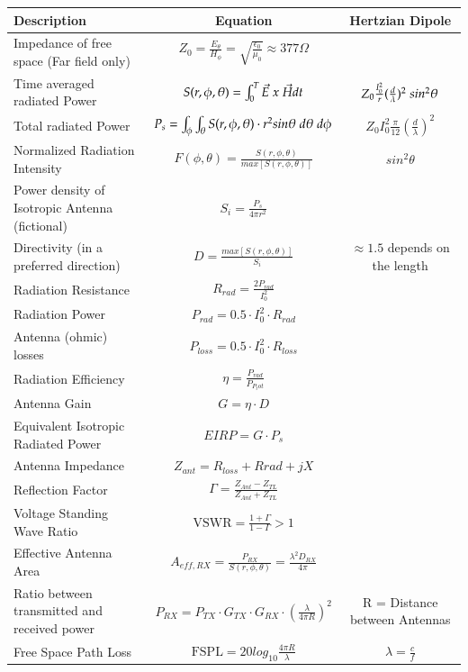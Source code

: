 \begin{tabular}{|l|c|c|}
	\hline \textbf{Description} & \textbf{Equation} & \textbf{Hertzian Dipole}\\
	\hline Impedance of free space (Far field only) & $Z_0 =\frac{E_\theta}{H_\phi} = \sqrt{\frac{\epsilon_0}{\mu_0}} \approx 377 \Omega$ & \\
	\hline Time averaged radiated Power & $S(r,\phi,\theta)=\int_{0}^{T}\vec{E}\hspace{0.1cm} x\hspace{0.1cm} \vec{H}dt $ & $Z_0 \frac{I_0^2}{r}(\frac{d}{\lambda})^2 \hspace{0.1cm} sin^2 \theta$ \\
	\hline Total radiated Power & $ P_s=\int_{\phi}^{}\int_{\theta}^{}S(r,\phi,\theta)\cdot r^2 sin\theta \hspace{0.1cm} d\theta\hspace{0.1cm} d\phi$ & $Z_0 I_0^2 \frac{\pi}{12}(\frac{d}{\lambda})^2$   \\
	\hline Normalized Radiation Intensity & $ F(\phi,\theta)=\frac{S(r,\phi,\theta)}{max[S(r,\phi,\theta)]}$ & $sin^2 \theta$\\
	\hline Power density of Isotropic Antenna (fictional) & $ S_i = \frac{P_s}{4\pi r^2}$ & \\
	\hline Directivity (in a preferred direction) & $ D = \frac{max[S(r,\phi,\theta)]}{S_i}$ & $\approx 1.5 $ depends on the length\\
	\hline Radiation Resistance & $ R_{rad} = \frac{2P_{rad}}{I_0^2}$ & \\
	\hline Radiation Power & $ P_{rad} = 0.5 \cdot I_0^2 \cdot R_{rad} $ & \\ 
	\hline Antenna (ohmic) losses & $ P_{loss} = 0.5 \cdot I_0^2 \cdot R_{loss} $ & \\ 
	\hline Radiation Efficiency & $ \eta = \frac{P_{rad}}{P_{P_tot}}$ & \\
	\hline Antenna Gain & $G = \eta \cdot D $ & \\
	\hline Equivalent Isotropic Radiated Power & $EIRP = G \cdot P_s$ & \\
	\hline Antenna Impedance & $ Z_{ant} = R_{loss}+R{rad} +jX $ & \\
	\hline Reflection Factor & $\Gamma = \frac{Z_{Ant}- Z_{TL}}{Z_{Ant} + Z_{TL}}$ & \\
	\hline Voltage Standing Wave Ratio & $ \textrm{VSWR} = \frac{1+\Gamma}{1-\Gamma} > 1$ & \\
	\hline Effective Antenna Area & $ A_{eff,RX} = \frac{P_{RX}}{S(r,\phi,\theta)} = \frac{\lambda^2 D_{RX}}{4\pi} $ & \\
	\hline Ratio between transmitted and received power & $ P_{RX} = P_{TX}\cdot G_{TX}\cdot G_{RX}\cdot (\frac{\lambda}{4 \pi R})^2 $ & R = Distance between Antennas\\
	\hline Free Space Path Loss & $ \textrm{FSPL} = 20log_{10} \frac{4\pi R}{\lambda}$ & $\lambda = \frac{c}{f}$ \\
	\hline 
\end{tabular} 



